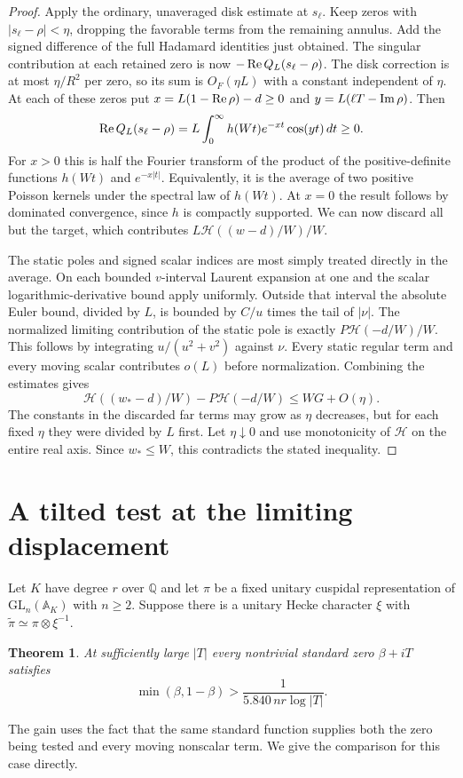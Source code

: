 \documentclass[11pt]{article}
\newtheorem{theorem}{Theorem}[section]\newtheorem{lemma}[theorem]{Lemma}\newtheorem{corollary}[theorem]{Corollary}
\begin{document}
\begin{proof}
Apply the ordinary, unaveraged disk estimate at $s_\ell$. Keep zeros with $|s_\ell-\rho|<\eta$, dropping the favorable terms from the remaining annulus. Add the signed difference of the full Hadamard identities just obtained. The singular contribution at each retained zero is now $-\operatorname{Re} Q_L(s_\ell-\rho)$. The disk correction is at most $\eta/R^2$ per zero, so its sum is $O_F(\eta L)$ with a constant independent of $\eta$. At each of these zeros put $x=L(1-\operatorname{Re}\rho)-d\ge0$ and $y=L(\ell T-\operatorname{Im}\rho)$. Then
\[
 \operatorname{Re} Q_L(s_\ell-\rho)=L\int_0^\infty h(Wt)e^{-xt}\cos(yt)\,dt\ge0 .
\]
For $x>0$ this is half the Fourier transform of the product of the positive-definite functions $h(Wt)$ and $e^{-x|t|}$. Equivalently, it is the average of two positive Poisson kernels under the spectral law of $h(Wt)$. At $x=0$ the result follows by dominated convergence, since $h$ is compactly supported. We can now discard all but the target, which contributes $L\mathcal H((w-d)/W)/W$.

The static poles and signed scalar indices are most simply treated directly in the average. On each bounded $v$-interval Laurent expansion at one and the scalar logarithmic-derivative bound apply uniformly. Outside that interval the absolute Euler bound, divided by $L$, is bounded by $C/u$ times the tail of $|\nu|$. The normalized limiting contribution of the static pole is exactly $P\mathcal H(-d/W)/W$. This follows by integrating $u/(u^2+v^2)$ against $\nu$. Every static regular term and every moving scalar contributes $o(L)$ before normalization. Combining the estimates gives
\[
 \mathcal H((w_*-d)/W)-P\mathcal H(-d/W)\le WG+O(\eta).
\]
The constants in the discarded far terms may grow as $\eta$ decreases, but for each fixed $\eta$ they were divided by $L$ first. Let $\eta\downarrow0$ and use monotonicity of $\mathcal H$ on the entire real axis. Since $w_*\le W$, this contradicts the stated inequality.
\end{proof}


\section{A tilted test at the limiting displacement}\label{rst:section}
Let $K$ have degree $r$ over $\mathbb Q$ and let $\pi$ be a fixed unitary cuspidal representation of $\mathrm{GL}_n(\mathbb A_K)$ with $n\ge2$. Suppose there is a unitary Hecke character $\xi$ with $\widetilde\pi\simeq\pi\otimes\xi^{-1}$.
\begin{theorem}\label{rst:theorem}
At sufficiently large $|T|$ every nontrivial standard zero $\beta+iT$ satisfies
\[
       \min(\beta,1-\beta)>\frac1{5.840\,nr\log|T|}.
\]
\end{theorem}
The gain uses the fact that the same standard function supplies both the zero being tested and every moving nonscalar term. We give the comparison for this case directly.
\end{document}

